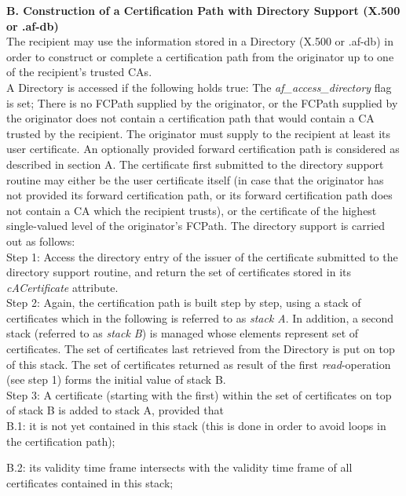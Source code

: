 {\bf B. Construction of a Certification Path with Directory Support (X.500 or .af-db)}
\\ [1em] 
The recipient may use the information stored in a Directory (X.500 or .af-db) in order to 
construct or complete a certification path from the originator up to one of the recipient's
trusted CAs.
\\ [1em]
A Directory is accessed if the following holds true:
\bi
\m The {\em af\_access\_directory} flag is set;
\m There is no FCPath supplied by the originator, or the FCPath supplied 
by the originator does not contain a certification path that would contain a 
CA trusted by the recipient.
\ei
The originator must supply to the recipient at least its user certificate. An optionally
provided forward certification path is considered as described in section A.
The certificate first submitted to the directory support routine may either be
\bi
\m the user certificate itself (in case that the originator has not provided
its forward certification path, or its forward certification path does not contain a 
CA which the recipient trusts),
\m or the certificate of the highest single-valued level of the originator's FCPath.
\ei
The directory support is carried out as follows:
\\ [1em]
Step 1: Access the directory entry of the issuer of the certificate submitted
to the directory support routine, and return the set of certificates stored in 
its {\em cACertificate} attribute.
\\ [1em]
Step 2: Again, the certification path is built step by step, using a stack of
certificates which in the following is referred to as {\em stack A}.
In addition, a second stack (referred to as {\em stack B}) is managed whose 
elements represent set of certificates. The set of certificates last retrieved 
from the Directory is put on top of this stack. The set of certificates returned 
as result of the first {\em read}-operation (see step 1) forms the initial value 
of stack B.
\\ [1em]
Step 3: A certificate (starting with the first) within the set of certificates
on top of stack B is added to stack A, provided that
\\ [1em]
B.1: it is not yet contained in this stack (this is done in order to avoid
loops in the certification path);

B.2: its validity time frame intersects with the validity time frame of all
certificates contained in this stack;

